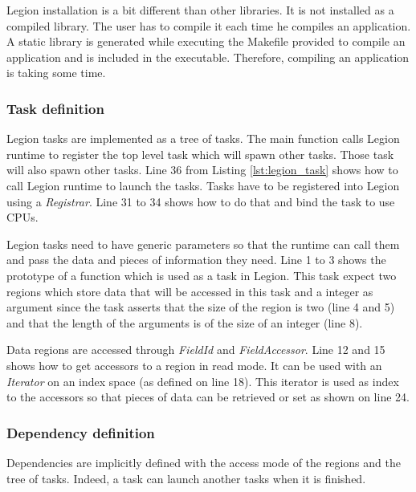 Legion installation is a bit different than other libraries.
It is not installed as a compiled library.
The user has to compile it each time he compiles an application.
A static library is generated while executing the Makefile provided to compile an application and is included in the executable.
Therefore, compiling an application is taking some time.

\begin{figure}

\end{figure}

\subsubsection{Task definition}
Legion tasks are implemented as a tree of tasks.
The main function calls Legion runtime to register the top level task which will spawn other tasks.
Those task will also spawn other tasks.
Line 36 from Listing \ref{lst:legion_task} shows how to call Legion runtime to launch the tasks.
Tasks have to be registered into Legion using a \textit{Registrar}.
Line 31 to 34 shows how to do that and bind the task to use CPUs.

Legion tasks need to have generic parameters so that the runtime can call them and pass the data and pieces of information they need.
Line 1 to 3 shows the prototype of a function which is used as a task in Legion.
This task expect two regions which store data that will be accessed in this task and a integer as argument since the task asserts that the size of the region is two (line 4 and 5) and that the length of the arguments is of the size of an integer (line 8).

Data regions are accessed through \textit{FieldId} and \textit{FieldAccessor}.
Line 12 and 15 shows how to get accessors to a region in read mode.
It can be used with an \textit{Iterator} on an index space (as defined on line 18).
This iterator is used as index to the accessors so that pieces of data can be retrieved or set as shown on line 24.


\begin{figure}[t]

\end{figure}

\subsubsection{Dependency definition}
Dependencies are implicitly defined with the access mode of the regions and the tree of tasks.
Indeed, a task can launch another tasks when it is finished.

